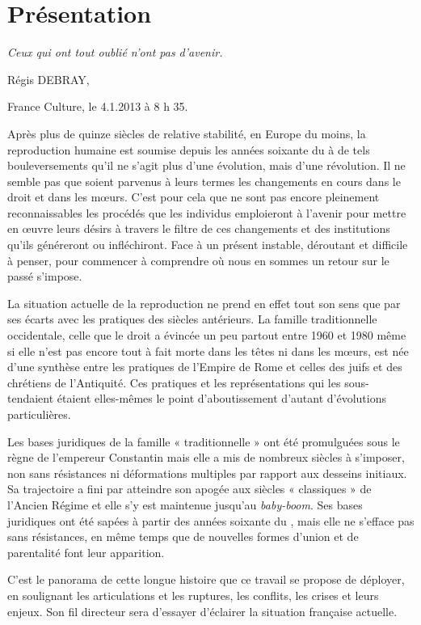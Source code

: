 

\chapter{Présentation}

\emph{Ceux qui ont tout oublié n'ont pas d'avenir.}


Régis DEBRAY, 

France Culture, le 4.1.2013 à 8 h 35.



Après plus de quinze siècles de relative stabilité, en Europe du moins, la reproduction humaine
est soumise depuis les années soixante du  à de tels bouleversements
qu'il ne s'agit plus d'une évolution, mais d'une révolution. Il
ne semble pas que soient  parvenus à leurs termes les changements en
cours dans le droit et dans les mœurs. C'est pour cela que ne sont pas
encore pleinement reconnaissables les procédés que les individus emploieront
à l'avenir pour mettre en œuvre leurs désirs à travers le filtre
de ces changements et des institutions qu'ils généreront ou infléchiront.
Face à un présent instable, déroutant et difficile à penser, pour commencer à
comprendre où nous en sommes
 un retour sur le passé s'impose.

La situation actuelle de la reproduction ne prend en
effet tout son sens que par ses écarts avec les pratiques des siècles antérieurs.
La famille traditionnelle occidentale, celle que le droit a évincée un peu partout entre 1960 et
1980 même si elle n'est pas encore tout à fait morte dans les têtes ni dans les mœurs, est
née d'une synthèse entre les pratiques de l'Empire de Rome et celles des
juifs et des chrétiens de l'Antiquité. Ces pratiques et les représentations
qui les sous-tendaient étaient elles-mêmes le point d'aboutissement
d'autant d'évolutions particulières.

Les bases juridiques de la famille « traditionnelle » ont été promulguées sous le règne
de l'empereur Constantin mais elle a mis de nombreux
siècles à s'imposer, non sans résistances ni déformations multiples par
rapport aux desseins initiaux. Sa trajectoire a fini par atteindre son apogée aux
siècles « classiques » de l'Ancien Régime et elle s'y est maintenue jusqu'au
\emph{baby-boom}. Ses bases juridiques ont été sapées à partir des années soixante du , mais elle ne s'efface pas sans résistances, en même temps que de nouvelles formes d'union et de parentalité font leur apparition.

C'est le panorama de cette longue histoire que ce travail se propose de déployer, en soulignant les articulations et les ruptures, les
conflits, les crises et leurs enjeux. Son fil directeur sera d'essayer d'éclairer la situation française actuelle.

